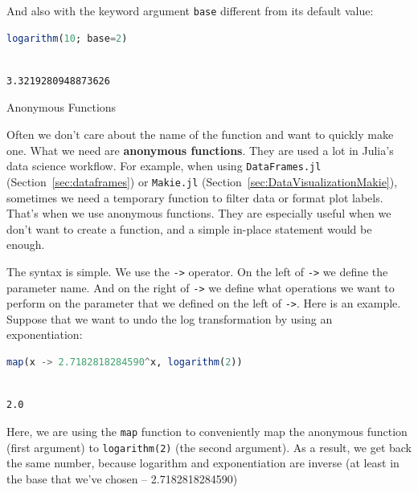 \documentclass[
  notoc %
]{tufte-book}
\makeatletter
\newcommand{\passthrough}[1]{#1}
\renewcommand\subsubsection{%
\@startsection{subsubsection}{3}{\z@ }{-3.25ex\@plus -1ex \@minus -.2ex}{1.5ex \@plus .2ex}{\normalfont \normalsize \bfseries }
}
\makeatother
\begin{document}
And also with the keyword argument \passthrough{\lstinline!base!}
different from its default value:

\begin{lstlisting}[language=Julia]
logarithm(10; base=2)
\end{lstlisting}

\begin{lstlisting}[language=Output]

3.3219280948873626

\end{lstlisting}

\hypertarget{sec:function_anonymous}{%
\subsubsection{Anonymous Functions}\label{sec:function_anonymous}}

Often we don't care about the name of the function and want to quickly
make one. What we need are \textbf{anonymous functions}. They are used a
lot in Julia's data science workflow. For example, when using
\passthrough{\lstinline!DataFrames.jl!} (Section~\ref{sec:dataframes})
or \passthrough{\lstinline!Makie.jl!}
(Section~\ref{sec:DataVisualizationMakie}), sometimes we need a
temporary function to filter data or format plot labels. That's when we
use anonymous functions. They are especially useful when we don't want
to create a function, and a simple in-place statement would be enough.

The syntax is simple. We use the \passthrough{\lstinline!->!} operator.
On the left of \passthrough{\lstinline!->!} we define the parameter
name. And on the right of \passthrough{\lstinline!->!} we define what
operations we want to perform on the parameter that we defined on the
left of \passthrough{\lstinline!->!}. Here is an example. Suppose that
we want to undo the log transformation by using an exponentiation:

\begin{lstlisting}[language=Julia]
map(x -> 2.7182818284590^x, logarithm(2))
\end{lstlisting}

\begin{lstlisting}[language=Output]

2.0

\end{lstlisting}

Here, we are using the \passthrough{\lstinline!map!} function to
conveniently map the anonymous function (first argument) to
\passthrough{\lstinline!logarithm(2)!} (the second argument). As a
result, we get back the same number, because logarithm and
exponentiation are inverse (at least in the base that we've chosen --
2.7182818284590)
\end{document}
